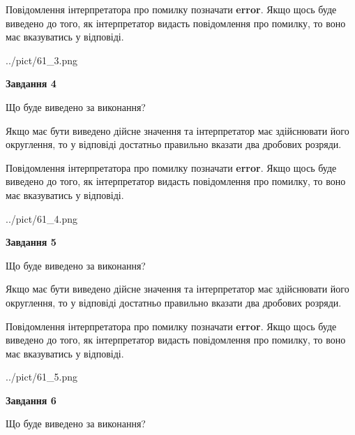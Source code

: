 \documentclass[12pt, ukrainian]{article}
\begin{document}
{\begin {Large}
Повідомлення інтерпретатора про помилку позначати \textbf{error}.
Якщо щось буде виведено до того, як інтерпретатор видасть повідомлення про помилку, 
то воно має вказуватись у відповіді. \par

\begin{center}
	{../pict/61_3.png}
\end{center}
\newpage

{\begin {center}\textbf{Завдання 4}\end {center}}\par
Що буде виведено за виконання? \par

Якщо має бути виведено дійсне значення та інтерпретатор має здійснювати його округлення, 
то у відповіді достатньо правильно вказати два дробових розряди.

Повідомлення інтерпретатора про помилку позначати \textbf{error}.
Якщо щось буде виведено до того, як інтерпретатор видасть повідомлення про помилку, 
то воно має вказуватись у відповіді. \par

\begin{center}
	{../pict/61_4.png}
\end{center}
\newpage

{\begin {center}\textbf{Завдання 5}\end {center}}\par
Що буде виведено за виконання? \par

Якщо має бути виведено дійсне значення та інтерпретатор має здійснювати його округлення, 
то у відповіді достатньо правильно вказати два дробових розряди.

Повідомлення інтерпретатора про помилку позначати \textbf{error}.
Якщо щось буде виведено до того, як інтерпретатор видасть повідомлення про помилку, 
то воно має вказуватись у відповіді. \par

\begin{center}
	{../pict/61_5.png}
\end{center}
\newpage

{\begin {center}\textbf{Завдання 6}\end {center}}\par
Що буде виведено за виконання? \par


\end{Large}}
\end{document}
